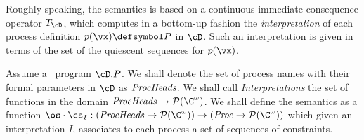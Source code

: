 \documentclass{tlp}
\begin{document}
  Roughly speaking,  the semantics is  based on a continuous immediate consequence operator $T_{\cD}$, which computes in a bottom-up fashion  the \emph{interpretation} of each  process definition $p(\vx) \defsymbol P$  in  $\cD$. Such an interpretation is given in terms of the set of the quiescent sequences for  $p(\vx)$.

Assume a \utcc\ program $\cD.P$. We shall denote  the set of process names with their  formal parameters in $\cD$ as ${\it ProcHeads}$. We shall call \emph{Interpretations} the set of functions in the domain ${\it ProcHeads} \rightarrow  {\mathcal{P}}(\C^\omega )$. We shall define the  semantics as a function  $\os \cdot\cs_I: ({\it ProcHeads} \rightarrow {\mathcal{P}}(\C^\omega) ) \rightarrow ({\it Proc} \rightarrow {\mathcal{P}}(\C^\omega) )$
which  given an interpretation $I$, associates to each process a set of  sequences of constraints.
\end{document}
